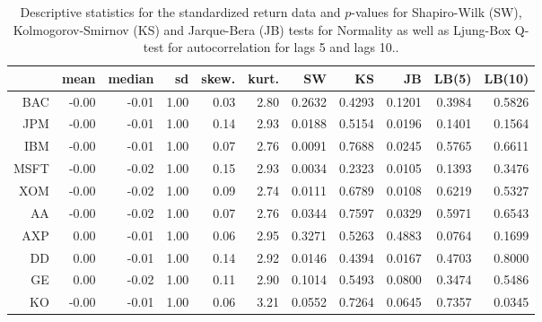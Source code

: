 \begin{table}[ht]
\centering
\begin{tabular}{rrrrrrrrrrr}
  \hline
 & mean & median & sd & skew. & kurt. & SW & KS & JB & LB(5) & LB(10) \\ 
  \hline
BAC & -0.00 & -0.01 & 1.00 & 0.03 & 2.80 & 0.2632 & 0.4293 & 0.1201 & 0.3984 & 0.5826 \\ 
  JPM & -0.00 & -0.01 & 1.00 & 0.14 & 2.93 & 0.0188 & 0.5154 & 0.0196 & 0.1401 & 0.1564 \\ 
  IBM & -0.00 & -0.01 & 1.00 & 0.07 & 2.76 & 0.0091 & 0.7688 & 0.0245 & 0.5765 & 0.6611 \\ 
  MSFT & -0.00 & -0.02 & 1.00 & 0.15 & 2.93 & 0.0034 & 0.2323 & 0.0105 & 0.1393 & 0.3476 \\ 
  XOM & -0.00 & -0.02 & 1.00 & 0.09 & 2.74 & 0.0111 & 0.6789 & 0.0108 & 0.6219 & 0.5327 \\ 
  AA & -0.00 & -0.02 & 1.00 & 0.07 & 2.76 & 0.0344 & 0.7597 & 0.0329 & 0.5971 & 0.6543 \\ 
  AXP & 0.00 & -0.01 & 1.00 & 0.06 & 2.95 & 0.3271 & 0.5263 & 0.4883 & 0.0764 & 0.1699 \\ 
  DD & 0.00 & -0.01 & 1.00 & 0.14 & 2.92 & 0.0146 & 0.4394 & 0.0167 & 0.4703 & 0.8000 \\ 
  GE & 0.00 & -0.02 & 1.00 & 0.11 & 2.90 & 0.1014 & 0.5493 & 0.0800 & 0.3474 & 0.5486 \\ 
  KO & -0.00 & -0.01 & 1.00 & 0.06 & 3.21 & 0.0552 & 0.7264 & 0.0645 & 0.7357 & 0.0345 \\ 
   \hline
\end{tabular}
\caption{Descriptive statistics for the standardized return data and
              $p$-values for  Shapiro-Wilk (SW), Kolmogorov-Smirnov (KS) and 
             Jarque-Bera (JB) tests for Normality as well as Ljung-Box Q-test
             for autocorrelation for lags 5 and lags 10..} 
\label{table:standrets_desc}
\end{table}
